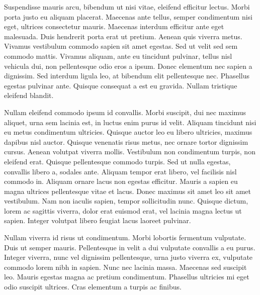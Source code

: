 \documentclass[a4paper,11pt]{article}
\begin{document}
Suspendisse mauris arcu, bibendum ut nisi vitae, eleifend efficitur lectus. Morbi porta justo eu aliquam placerat. Maecenas ante tellus, semper condimentum nisi eget, ultrices consectetur mauris. Maecenas interdum efficitur ante eget malesuada. Duis hendrerit porta erat ut pretium. Aenean quis viverra metus. Vivamus vestibulum commodo sapien sit amet egestas. Sed ut velit sed sem commodo mattis. Vivamus aliquam, ante eu tincidunt pulvinar, tellus nisl vehicula dui, non pellentesque odio eros a ipsum. Donec elementum nec sapien a dignissim. Sed interdum ligula leo, at bibendum elit pellentesque nec. Phasellus egestas pulvinar ante. Quisque consequat a est eu gravida. Nullam tristique eleifend blandit.

Nullam eleifend commodo ipsum id convallis. Morbi suscipit, dui nec maximus aliquet, urna sem lacinia est, in luctus enim purus id velit. Aliquam tincidunt nisi eu metus condimentum ultricies. Quisque auctor leo eu libero ultricies, maximus dapibus nisl auctor. Quisque venenatis risus metus, nec ornare tortor dignissim cursus. Aenean volutpat viverra mollis. Vestibulum non condimentum turpis, non eleifend erat. Quisque pellentesque commodo turpis. Sed ut nulla egestas, convallis libero a, sodales ante. Aliquam tempor erat libero, vel facilisis nisl commodo in. Aliquam ornare lacus non egestas efficitur. Mauris a sapien eu magna ultrices pellentesque vitae et lacus. Donec maximus sit amet leo sit amet vestibulum. Nam non iaculis sapien, tempor sollicitudin nunc. Quisque dictum, lorem ac sagittis viverra, dolor erat euismod erat, vel lacinia magna lectus ut sapien. Integer volutpat libero feugiat lacus laoreet pulvinar.

Nullam viverra id risus ut condimentum. Morbi lobortis fermentum vulputate. Duis ut semper mauris. Pellentesque in velit a dui vulputate convallis a eu purus. Integer viverra, nunc vel dignissim pellentesque, urna justo viverra ex, vulputate commodo lorem nibh in sapien. Nunc nec lacinia massa. Maecenas sed suscipit leo. Mauris egestas magna ac pretium condimentum. Phasellus ultricies mi eget odio suscipit ultrices. Cras elementum a turpis ac finibus. 
\end{document}
